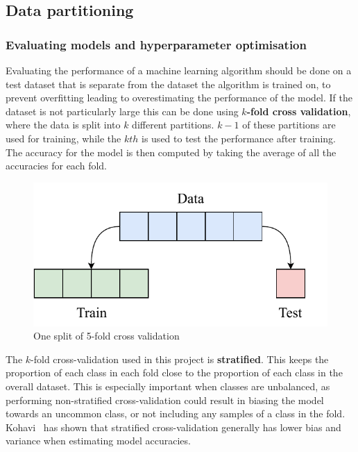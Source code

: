 \subsection{Data partitioning} \label{part}
\subsubsection{Evaluating models and hyperparameter optimisation}
Evaluating the performance of a machine learning algorithm should be done on a test dataset that is separate from the dataset the 
algorithm is trained on, to prevent overfitting leading to overestimating the performance of the model. If the dataset is not particularly 
large this can be done using 
\textbf{$k$-fold cross validation}, where the data is split into $k$ different partitions. $k-1$ of these partitions are used for training, 
while the $kth$ is used to test the performance after training. The accuracy for the model is then computed by taking the average of all
the accuracies for each fold.

\begin{figure}[H]
  \centering
  \includegraphics[scale=0.6]{figs/k_fold.pdf}
  \caption{One split of 5-fold cross validation}
\end{figure}

The $k$-fold cross-validation used in this project is \textbf{stratified}. This keeps the proportion of each class in each fold
close to the proportion of each class in the overall dataset. This is especially important when classes are unbalanced, as performing 
non-stratified cross-validation could result in biasing the model towards an uncommon class, or not including any samples of a class in the 
fold. Kohavi~\cite{Kohavi:1995:SCB:1643031.1643047} has shown that stratified cross-validation generally has lower bias and variance when estimating model 
accuracies.

